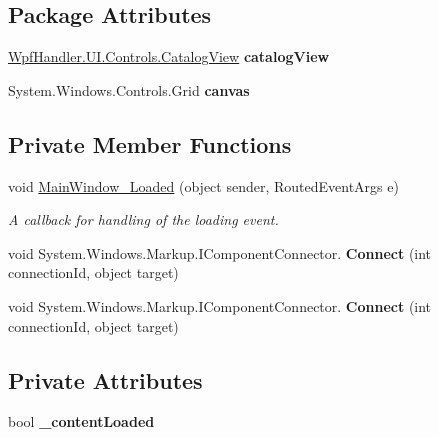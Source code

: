 \subsection*{Package Attributes}
\begin{DoxyCompactItemize}
\item 
\mbox{\label{class_main_plugin_based_app_1_1_main_window_a4fc035e403273d1664452e73cbbcde19}} 
\mbox{\hyperlink{class_wpf_handler_1_1_u_i_1_1_controls_1_1_catalog_view}{Wpf\+Handler.\+U\+I.\+Controls.\+Catalog\+View}} {\bfseries catalog\+View}
\item 
\mbox{\label{class_main_plugin_based_app_1_1_main_window_a954cc5202314fd628ec37c01529fbbaf}} 
System.\+Windows.\+Controls.\+Grid {\bfseries canvas}
\end{DoxyCompactItemize}
\subsection*{Private Member Functions}
\begin{DoxyCompactItemize}
\item 
void \mbox{\hyperlink{class_main_plugin_based_app_1_1_main_window_aa04b0efb148e8d72097aac790ca5731b}{Main\+Window\+\_\+\+Loaded}} (object sender, Routed\+Event\+Args e)
\begin{DoxyCompactList}\small\item\em A callback for handling of the loading event. \end{DoxyCompactList}\item 
\mbox{\label{class_main_plugin_based_app_1_1_main_window_a9171a817c80658d6a9d571579dae5a53}} 
void System.\+Windows.\+Markup.\+I\+Component\+Connector. {\bfseries Connect} (int connection\+Id, object target)
\item 
\mbox{\label{class_main_plugin_based_app_1_1_main_window_a9171a817c80658d6a9d571579dae5a53}} 
void System.\+Windows.\+Markup.\+I\+Component\+Connector. {\bfseries Connect} (int connection\+Id, object target)
\end{DoxyCompactItemize}
\subsection*{Private Attributes}
\begin{DoxyCompactItemize}
\item 
\mbox{\label{class_main_plugin_based_app_1_1_main_window_a2a60af936b8d1c1b9fc870699c27495b}} 
bool {\bfseries \+\_\+content\+Loaded}
\end{DoxyCompactItemize}


